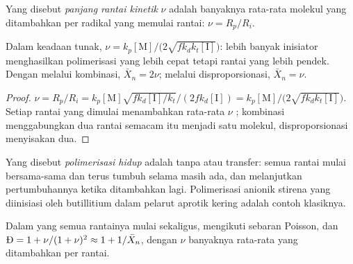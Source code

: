 \begin{definition}\label{def:b2:polymer-synthesis:chain-length}
Yang disebut \emph{panjang rantai kinetik}
$\nu$ adalah banyaknya rata-rata molekul  yang ditambahkan per
radikal yang memulai rantai: $\nu = R_p/R_i$.
\end{definition}

\begin{proposition}\label{prop:b2:polymer-synthesis:chain-length}
Dalam keadaan tunak, $\nu = k_p[\mathrm M]/\bigl(2\sqrt{fk_dk_t[\mathrm I]}\bigr)$:
lebih banyak inisiator menghasilkan polimerisasi yang lebih cepat tetapi
rantai yang lebih pendek. Dengan  melalui kombinasi, $\bar X_n = 2\nu$;
melalui disproporsionasi, $\bar X_n = \nu$.
\end{proposition}

\begin{proof}
$\nu = R_p/R_i = k_p[\mathrm M]\sqrt{fk_d[\mathrm I]/k_t}/(2fk_d[\mathrm I]) =
k_p[\mathrm M]/\bigl(2\sqrt{fk_dk_t[\mathrm I]}\bigr)$. Setiap rantai yang dimulai menambahkan rata-rata $\nu$ ;
kombinasi menggabungkan dua rantai semacam itu menjadi satu molekul,
disproporsionasi menyisakan dua.
\end{proof}

\begin{definition}\label{def:b2:polymer-synthesis:living}
Yang disebut \emph{polimerisasi hidup} adalah
 tanpa  atau transfer: semua rantai
mulai bersama-sama dan terus tumbuh selama  masih ada, dan
melanjutkan pertumbuhannya ketika  ditambahkan lagi. Polimerisasi
anionik stirena yang diinisiasi oleh butillitium dalam pelarut aprotik
kering adalah contoh klasiknya.
\end{definition}

\begin{proposition}\label{prop:b2:polymer-synthesis:living}
Dalam  yang semua rantainya mulai sekaligus,  mengikuti sebaran Poisson, dan
$\text{\DH} = 1 + \nu/(1+\nu)^2 \approx 1 + 1/\bar X_n$, dengan $\nu$
banyaknya rata-rata  yang ditambahkan per rantai.
\end{proposition}

